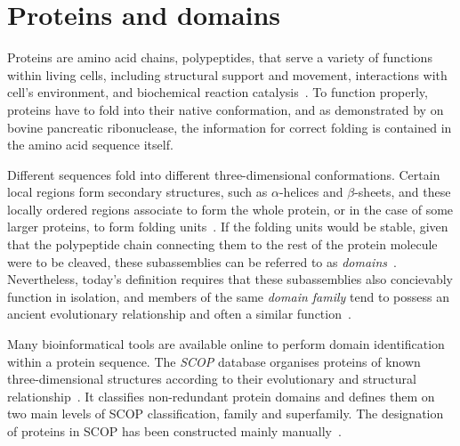 \label{intro}

\section*{Proteins and domains}
\label{intro:prodoms}

  Proteins are amino acid chains, polypeptides, that serve a variety of functions within
  living cells, including structural support and movement, interactions with cell's
  environment, and biochemical reaction catalysis~\cite{alberts2018molecular}.
  To function properly, proteins have to fold into their native conformation, and as
  demonstrated by \citet{anfinsen1961kinetics} on bovine pancreatic ribonuclease, the
  information for correct folding is contained in the amino acid sequence itself.

  Different sequences fold into different three-dimensional conformations.
  Certain local regions form secondary structures, such as $\alpha$-helices and
  $\beta$-sheets, and these locally ordered regions associate to form the whole protein,
  or in the case of some larger proteins, to form folding units~\cite{levitt1975computer}.
  If the folding units would be stable, given that the polypeptide chain connecting them
  to the rest of the protein molecule were to be cleaved, these subassemblies can be
  referred to as \emph{domains}~\cite{goldberg1969tertiary, levitt1975computer}.
  Nevertheless, today's definition requires that these subassemblies also concievably
  function in isolation, and members of the same \emph{domain family} tend to possess an
  ancient evolutionary relationship and often a similar
  function~\cite{ponting2002natural}.

  Many bioinformatical tools are available online to perform domain identification within
  a protein sequence.
  The \emph{SCOP} database organises proteins of known three-dimensional structures
  according to their evolutionary and structural relationship~\cite{murzin1995scop}.
  It classifies non-redundant protein domains and defines them on two main levels of SCOP
  classification, family and superfamily.
  The designation of proteins in SCOP has been constructed mainly
  manually~\cite{andreeva2020scop}.

